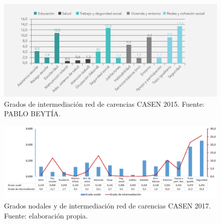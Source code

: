 \documentclass[12pt,letterpaper,spanish]{article}
\begin{document}
\begin{figure}[H]
    \centering
    \includegraphics[width=\textwidth]{beytia/grado_intermediación_beytía.png}
    \caption{Grados de intermediación red de carencias CASEN 2015. Fuente: PABLO BEYTÍA.}
    \label{intermediacion2015}
\end{figure}

\begin{figure}[H]
    \centering
    \includegraphics[width=\textwidth]{Grafos/nc_general.png}
    \caption{Grados nodales y de intermediación red de carencias CASEN 2017. Fuente: elaboración propia.}
    \label{nodos2017}
\end{figure}





\end{document}
